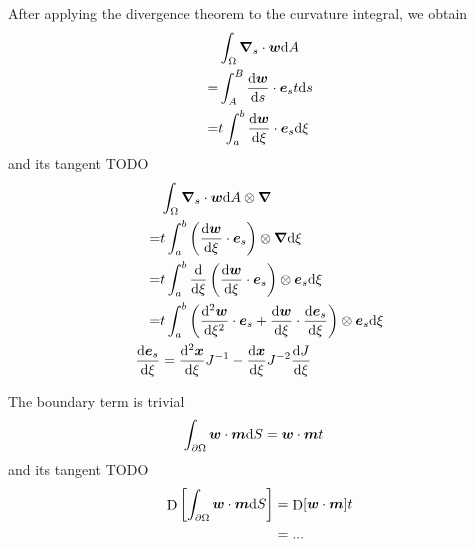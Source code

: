 \documentclass[a4paper,11pt]{article}
\renewcommand{\to}[1]{\text{\boldmath $#1$}} %
\newcommand{\intd}[1]{{\rm d}#1}
\newcommand{\dderiv}[2]{\frac{{\rm d}#1}{{\rm d}#2}}
\DeclareMathOperator{\diff}{D}
\begin{document}
After applying the divergence theorem to the curvature integral, we obtain
\begin{align}
  &\int_\Omega\to \nabla_s\cdot\to w\intd A\\
 =&\int_A^B\dderiv{\to w}{s}\cdot\to e_s t \intd s\\
 =&t \int_a^b \dderiv{\to w}{\xi}\cdot \to e_s \intd\xi\\
\end{align}
and its tangent TODO
\begin{align}
  &\int_\Omega\to \nabla_s\cdot\to w\intd A \otimes \to\nabla\\
 =&t \int_a^b \left(\dderiv{\to w}{\xi}\cdot \to e_s\right)\otimes\to\nabla\intd\xi\\
 =&t \int_a^b \dderiv{}{\xi}\left(\dderiv{\to w}{\xi}\cdot \to e_s\right)\otimes\to e_s\intd\xi\\
 =&t \int_a^b \left(\dderiv{^2\to w}{\xi^2}\cdot \to e_s + \dderiv{\to w}{\xi}\cdot\dderiv{\to e_s}{\xi}\right)\otimes\to e_s\intd\xi\\
 \dderiv{\to e_s}{\xi} &= \dderiv{^2\to x}{\xi}J^{-1} - \dderiv{\to x}{\xi}J^{-2}\dderiv{J}{\xi}
\end{align}

The boundary term is trivial
\begin{align}
 &\int_{\partial\Omega} \to w\cdot \to m\intd S = \to w \cdot\to m t
\end{align}
and its tangent TODO
\begin{align}
 \diff\left[\int_{\partial\Omega} \to w\cdot \to m\intd S\right] &= \diff[\to w \cdot\to m]t\\
 &= ...
\end{align}
\end{document}
